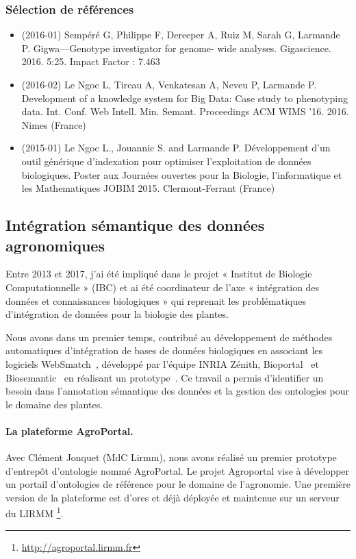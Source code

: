 \subsubsection*{Sélection de références}

\begin{itemize}
\item (2016-01) Sempéré G, Philippe F, Dereeper A, Ruiz M, Sarah G, Larmande P. Gigwa—Genotype investigator for genome- wide analyses. Gigascience. 2016. 5:25. Impact Factor : 7.463
\item (2016-02) Le Ngoc L, Tireau A, Venkatesan A, Neveu P, Larmande P. Development of a knowledge system for Big Data: Case study to phenotyping data. Int. Conf. Web Intell. Min. Semant. Proceedings ACM WIMS ’16. 2016. Nimes (France)
\item (2015-01) Le Ngoc L., Jouannic S. and Larmande P. Développement d'un outil générique d'indexation pour optimiser l'exploitation de données biologiques. Poster aux Journées ouvertes pour la Biologie, l’informatique et les Mathematiques JOBIM 2015. Clermont-Ferrant (France)
\end{itemize}


\subsection*{Intégration sémantique des données agronomiques}
\label{IBC}

Entre 2013 et 2017, j'ai été impliqué dans le projet « Institut de Biologie Computationnelle » (IBC) et ai été coordinateur de l’axe « intégration des données et connaissances biologiques » qui reprenait les problématiques d’intégration de données pour la biologie des plantes.

Nous avons dans un premier temps, contribué au développement de méthodes automatiques d’intégration de bases de données biologiques en associant les logiciels WebSmatch~\cite{Coletta2012}, développé par l’équipe INRIA Zénith, Bioportal~\cite{Noy2009,Melzi} et Biosemantic~\cite{wollbrett2013clever} en réalisant un prototype~\cite{castanier2014semantic}. Ce travail a permis d’identifier un besoin dans l’annotation sémantique des données et la gestion des ontologies pour le domaine des plantes. \\

\paragraph*{La plateforme AgroPortal.} Avec Clément Jonquet (MdC Lirmm), nous avons réalisé un premier prototype d’entrepôt d’ontologie nommé AgroPortal. Le projet Agroportal vise à développer un portail d'ontologies de référence pour le domaine de l'agronomie. Une première version de la plateforme est d’ores et déjà déployée et maintenue sur un serveur du LIRMM \footnote{\url{http://agroportal.lirmm.fr}}. 


